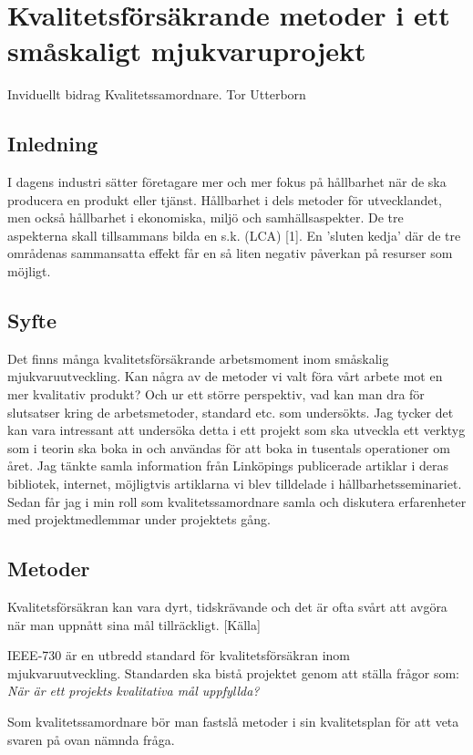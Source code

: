 \chapter{Kvalitetsförsäkrande metoder i ett småskaligt mjukvaruprojekt}
Inviduellt bidrag Kvalitetssamordnare. Tor Utterborn

\section{Inledning}
I dagens industri sätter företagare mer och mer fokus på hållbarhet när de ska producera en produkt eller tjänst. Hållbarhet i dels metoder för utvecklandet, men också hållbarhet i ekonomiska, miljö och samhällsaspekter.
De tre aspekterna skall tillsammans bilda en s.k. (LCA) [1]. En ’sluten kedja’ där de tre områdenas sammansatta effekt får en så liten negativ påverkan på resurser som möjligt.

\section{Syfte}
Det finns många kvalitetsförsäkrande arbetsmoment inom småskalig mjukvaruutveckling. Kan några av de metoder vi valt föra vårt arbete mot en mer kvalitativ produkt? Och ur ett större perspektiv, vad kan man dra för slutsatser kring de arbetsmetoder, standard etc. som undersökts.
Jag tycker det kan vara intressant att undersöka detta i ett projekt som ska utveckla ett verktyg som i teorin ska boka in och användas för att boka in tusentals operationer om året.
Jag tänkte samla information från Linköpings publicerade artiklar i deras bibliotek, internet, möjligtvis artiklarna vi blev tilldelade i hållbarhetsseminariet. Sedan får jag i min roll som kvalitetssamordnare samla och diskutera erfarenheter med projektmedlemmar under projektets gång.

\section{Metoder}

Kvalitetsförsäkran kan vara dyrt, tidskrävande och det är ofta svårt att avgöra när man uppnått sina mål tillräckligt. [Källa]

IEEE-730 är en utbredd standard för kvalitetsförsäkran inom mjukvaruutveckling. Standarden ska bistå projektet genom att ställa frågor som:
\\
\emph{När är ett projekts kvalitativa mål uppfyllda?}

Som kvalitetssamordnare bör man fastslå metoder i sin kvalitetsplan för att veta svaren på ovan nämnda fråga. \\

